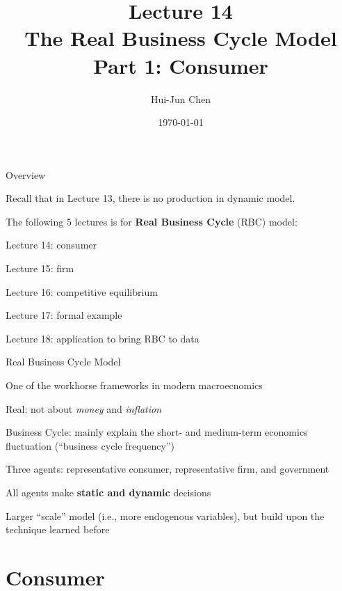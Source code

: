 \documentclass[11pt,aspectratio=169,usenames,dvipsnames]{beamer}
\title[Lecture 14]{Lecture 14 \\ The Real Business Cycle Model \\ Part 1: Consumer}
\author[Hui-Jun Chen]{Hui-Jun Chen}
\institute[NTHU]{National Tsing Hua University}
\date{\today}
\let\tempone\itemize
\let\temptwo\enditemize
\renewenvironment{itemize}{\tempone\addtolength{\itemsep}{\fill}}{\temptwo}
\begin{document}
\begin{frame}[plain]
    \titlepage
\end{frame}

\begin{frame}{Overview}
\label{slide:Overview}
    \begin{itemize}
        \item Recall that in Lecture 13, there is no production in dynamic model.
        \item The following $ 5 $ lectures is for \textbf{Real Business Cycle} (RBC) model:
        \begin{itemize}
            \item Lecture 14: consumer
            \item Lecture 15: firm
            \item Lecture 16: competitive equilibrium
            \item Lecture 17: formal example
            \item Lecture 18: application to bring RBC to data
        \end{itemize}
    \end{itemize}
\end{frame}

\begin{frame}{Real Business Cycle Model}
\label{slide:Real_Business_Cycle_Model}
\begin{itemize}
    \item One of the workhorse frameworks in modern macroecnomics
    \item \alert{Real}: not about \textit{money} and \textit{inflation}
    \item \alert{Business Cycle}: mainly explain the short- and medium-term economics fluctuation (``business cycle frequency'')
    \item Three agents: representative consumer, representative firm, and government
    \item All agents make \textbf{static and dynamic} decisions
    \item Larger ``scale'' model (i.e., more endogenous variables), but build upon the technique learned before
\end{itemize}
\end{frame}

\section{Consumer}
\label{sec:Consumer}
\end{document}
